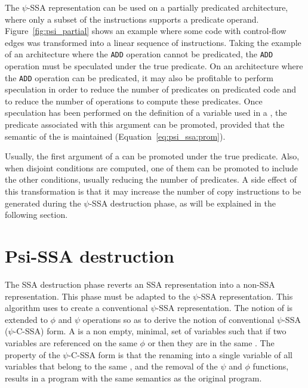 The $\psi$-SSA representation can be used on a
  partially predicated architecture, where only a subset of the
  instructions supports a predicate operand.
  Figure~\ref{fig:psi_partial} shows an example where some code with
  control-flow edges was transformed into a linear sequence of
  instructions.
%
Taking the example of an architecture where the \texttt{ADD} operation
cannot be predicated, the \texttt{ADD} operation must be speculated
under the {true} predicate. 
%
On an architecture where the \texttt{ADD} operation can be predicated, it
may also be profitable to perform speculation in order to reduce the
number of predicates on predicated code and to reduce the number of
operations to compute these predicates. 
%
Once speculation has been performed on the definition of a variable
used in a \psifun, the predicate associated with this argument
can be promoted, provided that the semantic of the \psifun is maintained (Equation~\ref{eq:psi_ssa:prom}). 



Usually, the first argument of a \psifun can be promoted
under the {true} predicate. Also, when disjoint conditions are
computed, one of them can be promoted to include the other conditions,
usually reducing the number of predicates. A side effect of this
transformation is that it may increase the number of copy instructions
to be generated during the $\psi$-SSA destruction phase,
as will be explained in the following section.


\section{Psi-SSA destruction}
\label{sec:Psi_ssa_destruction}



The SSA destruction phase reverts an SSA representation into a non-SSA
representation. This phase must be adapted to the $\psi$-SSA
representation. This algorithm uses
\phipsiwebs to create a conventional $\psi$-SSA
representation. The notion of \phiwebs is 
extended to $\phi$ and $\psi$ operations so as to derive the notion of
conventional $\psi$-SSA ($\psi$-C-SSA) form. A \phipsiweb is
a non empty, minimal, set of variables such that if two variables are
referenced on the same $\phi$ or \psifun then they are in the
same \phipsiweb. The property of the $\psi$-C-SSA form is that the
renaming into a single variable of all variables that belong to the
same \phipsiweb, and the removal of the $\psi$ and $\phi$
functions, results in a program with the same semantics as the
original program.

